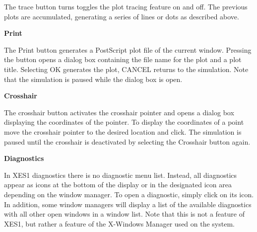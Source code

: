 \begin{section}
\begin{subsection}
\begin{subsubsection}
      The trace button turns toggles the plot tracing feature on and off.  The
      previous plots are accumulated, generating a series of lines or dots as
      described above.
\end{subsubsection}

\begin{subsubsection}
{\bf Print}

      The Print button generates a PostScript plot file of the current window.
      Pressing the button opens a dialog box containing the file name for the
      plot and a plot title.  Selecting OK generates the plot, CANCEL returns
      to the simulation.  Note that the simulation is paused while the dialog
      box is open.
\end{subsubsection}

\begin{subsubsection}
{\bf Crosshair}

      The crosshair button activates the crosshair pointer and opens a dialog
      box displaying the coordinates of the pointer.  To display the
      coordinates of a point move the crosshair pointer to the desired location
      and click.  The simulation is paused until the crosshair is deactivated
      by selecting the Crosshair button again.
\end{subsubsection}
\end{subsection}

\begin{subsection}
{\bf Diagnostics}

   In XES1 diagnostics there is no diagnostic menu list.  Instead, all
   diagnostics appear as icons at the bottom of the display or in the
   designated icon area depending on the window manager.  To open a diagnostic,
   simply click on its icon.  In addition, some window managers will display a
   list of the available diagnostics with all other open windows in a window
   list.  Note that this is not a feature of XES1, but rather a feature of the
   X-Windows Manager used on the system.
\end{subsection}
\end{section}

